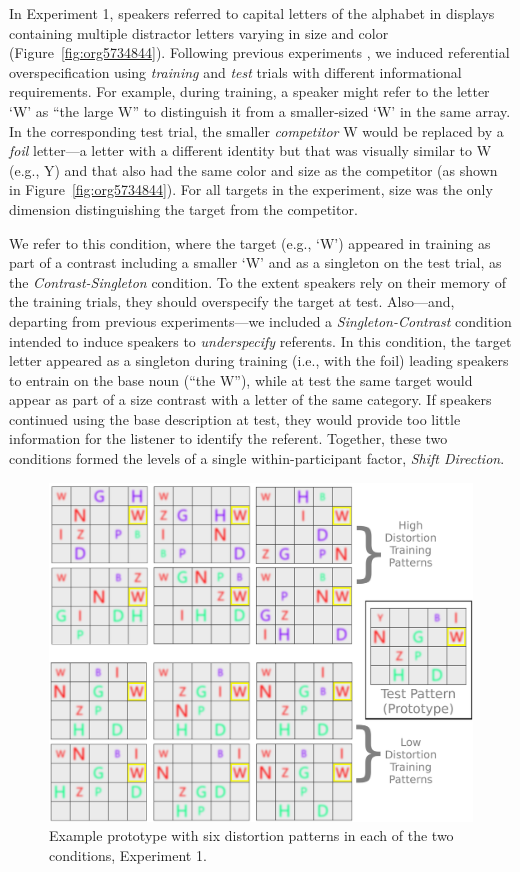 \documentclass[natbib,doc,a4paper]{apa6}
\begin{document}
In Experiment 1, speakers referred to capital letters of the alphabet in displays containing multiple distractor letters varying in size and color (Figure~\ref{fig:org5734844}). Following previous experiments \citep{brennanclark96,GannBarr2014}, we induced referential overspecification using \emph{training} and \emph{test} trials with different informational requirements. For example, during training, a speaker might refer to the letter `W' as ``the large W'' to distinguish it from a smaller-sized `W' in the same array. In the corresponding test trial, the smaller \emph{competitor} W would be replaced by a \emph{foil} letter---a letter with a different identity but that was visually similar to W (e.g., Y) and that also had the same color and size as the competitor (as shown in Figure~\ref{fig:org5734844}). For all targets in the experiment, size was the only dimension distinguishing the target from the competitor.

We refer to this condition, where the target (e.g., `W') appeared in training as part of a contrast including a smaller `W' and as a singleton on the test trial, as the  \emph{Contrast-Singleton} condition. To the extent speakers rely on their memory of the training trials, they should overspecify the target at test. Also---and, departing from previous experiments---we included a \emph{Singleton-Contrast} condition intended to induce speakers to \emph{underspecify} referents. In this condition, the target letter appeared as a singleton during training (i.e., with the foil) leading speakers to entrain on the base noun (``the W''), while at test the same target would appear as part of a size contrast with a letter of the same category. If speakers continued using the base description at test, they would provide too little information for the listener to identify the referent.  Together, these two conditions formed the levels of a single within-participant factor, \emph{Shift Direction}.

\begin{figure}[htbp]
\centering
\includegraphics[width=.9\linewidth]{figs/Exp1_HvL.png}
\caption{\label{fig:org106511e}
Example prototype with six distortion patterns in each of the two conditions, Experiment 1.}
\end{figure}
\end{document}

